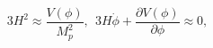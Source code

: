 \begin{equation}
\label{3eq5}
3 H^2 \approx \frac{V(\phi)}{M_p^2},~~
 3 H \dot \phi + \frac{\partial V(\phi)}{\partial \phi} \approx 0,
\end{equation}


